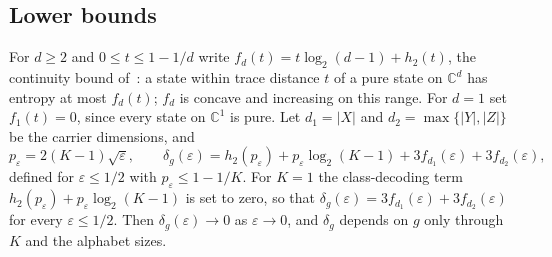 \subsection{Lower bounds}

For $d\ge2$ and $0\le t\le1-1/d$ write $f_d(t)=t\log_2(d-1)+h_2(t)$, the continuity bound of~\cite{Audenaert07}: a state within trace distance $t$ of a pure state on $\mathbb C^d$ has entropy at most $f_d(t)$; $f_d$ is concave and increasing on this range. For $d=1$ set $f_1(t)=0$, since every state on $\mathbb C^1$ is pure. Let $d_1=|X|$ and $d_2=\max\{|Y|,|Z|\}$ be the carrier dimensions, and
\[
p_\varepsilon=2(K-1)\sqrt\varepsilon,\qquad
\delta_g(\varepsilon)=h_2(p_\varepsilon)+p_\varepsilon\log_2(K-1)+3f_{d_1}(\varepsilon)+3f_{d_2}(\varepsilon),
\]
defined for $\varepsilon\le1/2$ with $p_\varepsilon\le1-1/K$. For $K=1$ the class-decoding term $h_2(p_\varepsilon)+p_\varepsilon\log_2(K-1)$ is set to zero, so that $\delta_g(\varepsilon)=3f_{d_1}(\varepsilon)+3f_{d_2}(\varepsilon)$ for every $\varepsilon\le1/2$. Then $\delta_g(\varepsilon)\to0$ as $\varepsilon\to0$, and $\delta_g$ depends on $g$ only through $K$ and the alphabet sizes.

